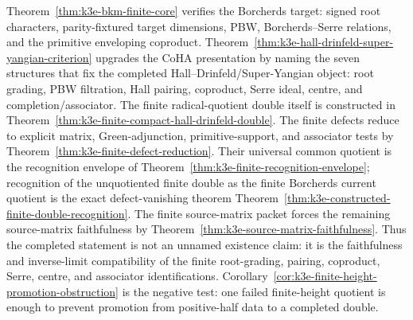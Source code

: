 \begin{remark}
\label{rem:k3e-full-hall-drinfeld-criterion-use}
Theorem~\ref{thm:k3e-bkm-finite-core} verifies the Borcherds target:
signed root characters, parity-fixtured target dimensions, PBW,
Borcherds--Serre relations, and the primitive enveloping coproduct.
Theorem~\ref{thm:k3e-hall-drinfeld-super-yangian-criterion}
upgrades the CoHA presentation by naming the seven structures that fix
the completed Hall--Drinfeld/Super-Yangian object: root grading, PBW
filtration, Hall pairing, coproduct, Serre ideal, centre, and
completion/associator. The finite radical-quotient double itself is
constructed in
Theorem~\ref{thm:k3e-finite-compact-hall-drinfeld-double}. The finite
defects reduce to explicit matrix, Green-adjunction, primitive-support,
and associator tests by
Theorem~\ref{thm:k3e-finite-defect-reduction}. Their universal common
quotient is the recognition envelope of
Theorem~\ref{thm:k3e-finite-recognition-envelope}; recognition of the
unquotiented finite double as the finite Borcherds current quotient is
the exact defect-vanishing theorem
Theorem~\ref{thm:k3e-constructed-finite-double-recognition}. The finite
source-matrix packet forces the remaining source-matrix faithfulness by
Theorem~\ref{thm:k3e-source-matrix-faithfulness}. Thus the
completed statement is not an unnamed existence claim: it is the
faithfulness and inverse-limit compatibility of the finite root-grading,
pairing, coproduct, Serre, centre, and associator identifications.
Corollary~\ref{cor:k3e-finite-height-promotion-obstruction} is the
negative test: one failed finite-height quotient is enough to prevent
promotion from positive-half data to a completed double.
\end{remark}

